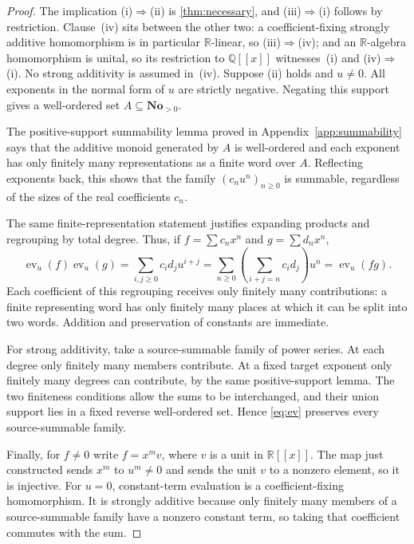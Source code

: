 \documentclass[11pt,letterpaper]{article}
\theoremstyle{definition}
\theoremstyle{remark}
\newcommand{\No}{\mathbf{No}}
\newcommand{\R}{\mathbb R}
\newcommand{\Q}{\mathbb Q}
\newcommand{\ev}{\operatorname{ev}}
\begin{document}
\begin{proof}
The implication (i)$\Rightarrow$(ii) is \cref{thm:necessary}, and
(iii)$\Rightarrow$(i) follows by restriction. Clause~(iv) sits between the
other two: a coefficient-fixing strongly additive homomorphism is in
particular $\R$-linear, so (iii)$\Rightarrow$(iv); and an $\R$-algebra
homomorphism is unital, so its restriction to $\Q[[x]]$ witnesses~(i) and
(iv)$\Rightarrow$(i). No strong additivity is assumed in~(iv). Suppose (ii) holds and $u\ne0$.
All exponents in the normal form of $u$ are strictly negative. Negating this
support gives a well-ordered set $A\subseteq\No_{>0}$.

The positive-support summability lemma proved in
Appendix~\ref{app:summability} says that the additive monoid generated by
$A$ is well-ordered and each exponent has only finitely many representations
as a finite word over $A$. Reflecting exponents back, this shows that the
family $(c_nu^n)_{n\ge0}$ is summable, regardless of the sizes of the real
coefficients $c_n$.

The same finite-representation statement justifies expanding products and
regrouping by total degree. Thus, if $f=\sum c_nx^n$ and $g=\sum d_nx^n$,
\[
 \ev_u(f)\ev_u(g)
 =\sum_{i,j\ge0}c_id_ju^{i+j}
 =\sum_{n\ge0}\left(\sum_{i+j=n}c_id_j\right)u^n
 =\ev_u(fg).
\]
Each coefficient of this regrouping receives only finitely many contributions:
a finite representing word has only finitely many places at which it can be
split into two words. Addition and preservation of constants are immediate.

For strong additivity, take a source-summable family of power series. At each
degree only finitely many members contribute. At a fixed target exponent only
finitely many degrees can contribute, by the same positive-support lemma.
The two finiteness conditions allow the sums to be interchanged, and their
union support lies in a fixed reverse well-ordered set. Hence \eqref{eq:ev}
preserves every source-summable family.

Finally, for $f\ne0$ write $f=x^m v$, where $v$ is a unit in $\R[[x]]$.
The map just constructed sends $x^m$ to $u^m\ne0$ and sends the unit $v$
to a nonzero element, so it is injective. For $u=0$, constant-term evaluation
is a coefficient-fixing homomorphism. It is strongly additive because only
finitely many members of a source-summable family have a nonzero constant
term, so taking that coefficient commutes with the sum.
\end{proof}
\end{document}
